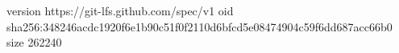 version https://git-lfs.github.com/spec/v1
oid sha256:348246acdc1920f6e1b90c51f0f2110d6bfcd5e08474904c59f6dd687acc66b0
size 262240
